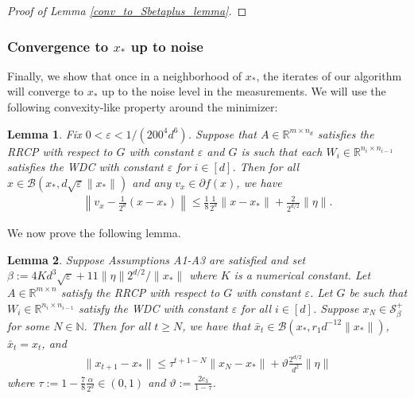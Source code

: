 \documentclass[11pt]{article}
\renewcommand{\epsilon}{\varepsilon}
\newcommand{\R}{\mathbb{R}}
\newcommand{\N}{\mathbb{N}}
\newcommand{\al}{\alpha}
\newcommand{\Seps}{\mathcal{S}}
\newcommand{\G}{G}
\newtheorem{lem}{Lemma}
\theoremstyle{remark}
\begin{document}
\begin{proof}[Proof of Lemma \ref{conv_to_Sbetaplus_lemma}]
\end{proof}
\subsubsection{Convergence to $x_*$ up to noise} \label{conv_proof_third_subsection}

Finally, we show that once in a neighborhood of $x_*$, the iterates of our algorithm will converge to $x_*$ up to the noise level in the measurements. We will use the following convexity-like property around the minimizer: 
\begin{lem} \label{convexity_lemma} Fix $0 < \epsilon < 1/(200^4d^6 )$. Suppose that $A \in \R^{m \times n_d}$ satisfies the RRCP with respect to $\G$ with constant $\epsilon$ and $\G$ is such that each $W_i \in \R^{n_i \times n_{i-1}}$ satisfies the WDC with constant $\epsilon$ for $i \in [d]$. Then for all $x \in \mathcal{B}(x_*,d\sqrt{\epsilon}\|x_*\|)$ and any $v_x \in \partial f(x)$, we have \begin{align*}
\left\| v_x - \frac{1}{2^d} (x - x_*) \right\| \leqslant \frac{1}{8}\frac{1}{2^d}\|x- x_*\| + \frac{2}{2^{d/2}}\|\eta\|.
\end{align*}
\end{lem}

\noindent We now prove the following lemma.

\begin{lem} \label{conv_to_xstar_up_to_noise_lem}
Suppose Assumptions A1-A3 are satisfied and set $\beta:= 4Kd^3\sqrt{\epsilon} + 11\|\eta\|2^{d/2}/\|x_*\|$ where $K$ is a numerical constant. Let $A \in \R^{m \times n}$ satisfy the RRCP with respect to $\G$ with constant $\epsilon$. Let $\G$ be such that $W_{i} \in \R^{n_i \times n_{i-1}}$ satisfy the WDC with constant $\epsilon$ for all $i \in [d]$. Suppose $x_N \in \Seps_{\beta}^+$ for some $N \in \N$. Then for all $t \geqslant N$, we have that $\bar{x}_t \in \mathcal{B}(x_*, r_1d^{-12}\|x_*\|)$, $\bar{x}_t = x_t$, and \begin{align*}
    \|x_{t+1} - x_*\| \leqslant \tau^{t+1-N}\|x_N - x_*\| + \vartheta\frac{2^{d/2}}{d^2}\|\eta\|
\end{align*} where $\tau := 1 - \frac{7}{8}\frac{\al}{2^d} \in (0,1)$ and $\vartheta := \frac{2c_3}{1-\tau}$.
\end{lem}
\end{document}
